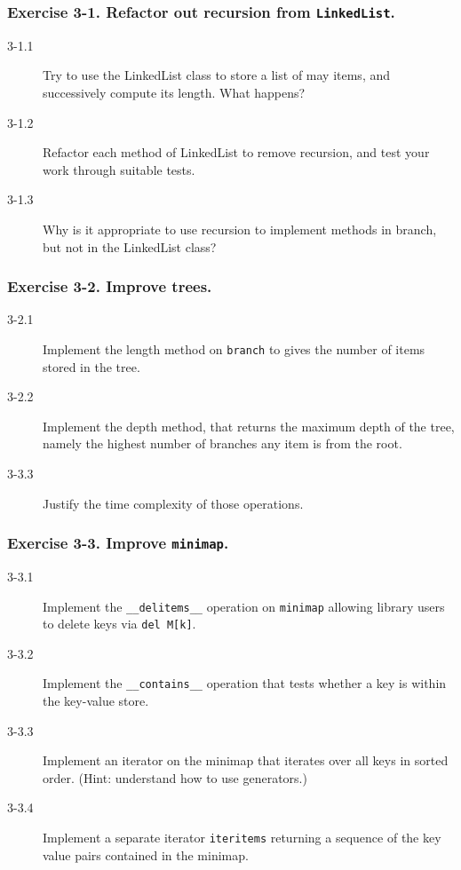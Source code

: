 \documentclass{beamer} %
\begin{document}
\begin{frame}

\frametitle{Exercise 3-1. Refactor out recursion from \texttt{LinkedList}.}

\begin{description}
  \item[3-1.1] Try to use the LinkedList class to store a list of may items, and successively compute its length. What happens?
  \item[3-1.2] Refactor each method of LinkedList to remove recursion, and test your work through suitable tests.
  \item[3-1.3] Why is it appropriate to use recursion to implement methods in branch, but not in the LinkedList class?
\end{description}

\end{frame}


\begin{frame}

\frametitle{Exercise 3-2. Improve trees.}

\begin{description}
  \item[3-2.1] Implement the length method on \texttt{branch} to gives the number of items stored in the tree.
  \item[3-2.2] Implement the depth method, that returns the maximum depth of the tree, namely the highest number of branches any item is from the root.
  \item[3-3.3] Justify the time complexity of those operations.
\end{description}


\end{frame}

\begin{frame}

\frametitle{Exercise 3-3. Improve \texttt{minimap}.}

\begin{description}
  \item[3-3.1] Implement the \texttt{\_\_delitems\_\_} operation on \texttt{minimap} allowing library users to delete keys via \texttt{del M[k]}.
  \item[3-3.2] Implement the \texttt{\_\_contains\_\_} operation that tests whether a key is within the key-value store.
  \item[3-3.3] Implement an iterator on the minimap that iterates over all keys in sorted order. (Hint: understand how to use generators.)
  \item[3-3.4] Implement a separate iterator \texttt{iteritems} returning a sequence of the key value pairs contained in the minimap.
\end{description}

\end{frame}
\end{document}
